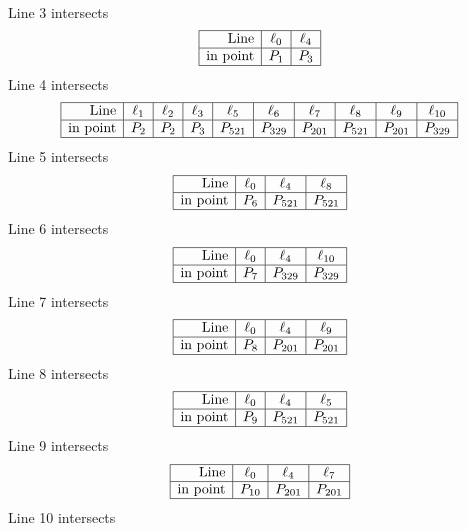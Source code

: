 \documentclass{article}
\begin{document}
{$$\begin{array}{|r*{3}{|c}|}
\end{array}
$$
Line 3 intersects 
$$
\begin{array}{|r*{2}{|c}|}
\hline
\mbox{Line}  & \ell_{0} & \ell_{4}\\
\hline
\mbox{in point}  & P_{1} & P_{3}\\
\hline
\end{array}
$$
Line 4 intersects 
$$
\begin{array}{|r*{9}{|c}|}
\hline
\mbox{Line}  & \ell_{1} & \ell_{2} & \ell_{3} & \ell_{5} & \ell_{6} & \ell_{7} & \ell_{8} & \ell_{9} & \ell_{10}\\
\hline
\mbox{in point}  & P_{2} & P_{2} & P_{3} & P_{521} & P_{329} & P_{201} & P_{521} & P_{201} & P_{329}\\
\hline
\end{array}
$$
Line 5 intersects 
$$
\begin{array}{|r*{3}{|c}|}
\hline
\mbox{Line}  & \ell_{0} & \ell_{4} & \ell_{8}\\
\hline
\mbox{in point}  & P_{6} & P_{521} & P_{521}\\
\hline
\end{array}
$$
Line 6 intersects 
$$
\begin{array}{|r*{3}{|c}|}
\hline
\mbox{Line}  & \ell_{0} & \ell_{4} & \ell_{10}\\
\hline
\mbox{in point}  & P_{7} & P_{329} & P_{329}\\
\hline
\end{array}
$$
Line 7 intersects 
$$
\begin{array}{|r*{3}{|c}|}
\hline
\mbox{Line}  & \ell_{0} & \ell_{4} & \ell_{9}\\
\hline
\mbox{in point}  & P_{8} & P_{201} & P_{201}\\
\hline
\end{array}
$$
Line 8 intersects 
$$
\begin{array}{|r*{3}{|c}|}
\hline
\mbox{Line}  & \ell_{0} & \ell_{4} & \ell_{5}\\
\hline
\mbox{in point}  & P_{9} & P_{521} & P_{521}\\
\hline
\end{array}
$$
Line 9 intersects 
$$
\begin{array}{|r*{3}{|c}|}
\hline
\mbox{Line}  & \ell_{0} & \ell_{4} & \ell_{7}\\
\hline
\mbox{in point}  & P_{10} & P_{201} & P_{201}\\
\hline
\end{array}
$$
Line 10 intersects 
$$
\begin{array}{|r*{3}{|c}|}

\end{array}$$}
\end{document}
